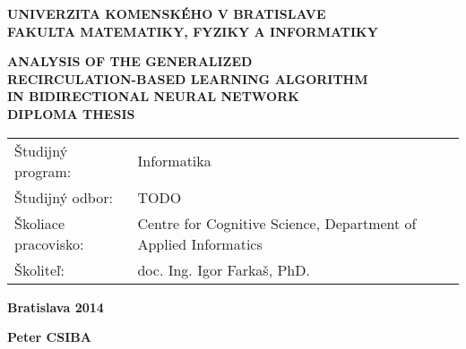 \begin{center}
    \large{
        \textbf{
            UNIVERZITA KOMENSKÉHO V BRATISLAVE \\ 
            FAKULTA MATEMATIKY, FYZIKY A INFORMATIKY
        }
    }
\end{center}


\vspace{5cm}

\begin{center}
    \large{
        \textbf{
            ANALYSIS OF THE GENERALIZED \\
            RECIRCULATION-BASED LEARNING ALGORITHM \\
            IN BIDIRECTIONAL NEURAL NETWORK \\
            \vspace{3cm}
            DIPLOMA THESIS
        }
    }
\end{center}

\vfill

\begin{center}
    \begin{tabular}{ll}
        Študijný program:               &   Informatika \\
        Študijný odbor:                 &   TODO \\
        Školiace pracovisko:            &   Centre for Cognitive Science, Department of Applied Informatics \\
        Školiteľ:                       &   doc. Ing. Igor Farkaš, PhD. \\
    \end{tabular}
\end{center}

\vfill

\begin{multicols}{2}
    \begin{flushleft}
        \textbf{Bratislava 2014}
    \end{flushleft}
    \begin{flushright}
        \textbf{Peter CSIBA}
    \end{flushright}
\end{multicols}
